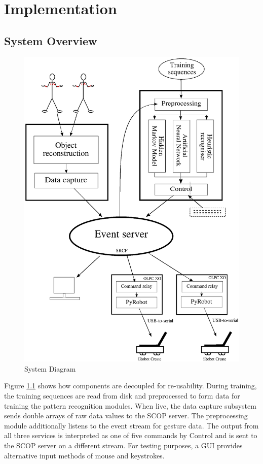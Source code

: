 \documentclass[12pt,a4,notitlepage]{report}
\renewcommand{\_}{\texttt{\symbol{95}}}
\newcommand{\<}{\texttt{\symbol{60}}}
\renewcommand{\>}{\texttt{\symbol{62}}}
\begin{document}
{\chapter{Implementation}

\section{System Overview}

\begin{figure}
\centering
\includegraphics[scale=0.6,angle=0]{diagrams/systemdiagram.ps}
\caption{System Diagram}
\label{sysdiag}
\end{figure}

Figure \ref{sysdiag} shows how components are decoupled for re-usability. During training, the training sequences are read from disk and preprocessed to form data for training the pattern recognition modules. When live, the data capture subsystem sends double arrays of raw data values to the SCOP server. The preprocessing module additionally listens to the event stream for gesture data. The output from all three services is interpreted as one of five commands by Control and is sent to the SCOP server on a different stream. For testing purposes, a GUI provides alternative input methods of mouse and keystrokes.

}
\end{document}
